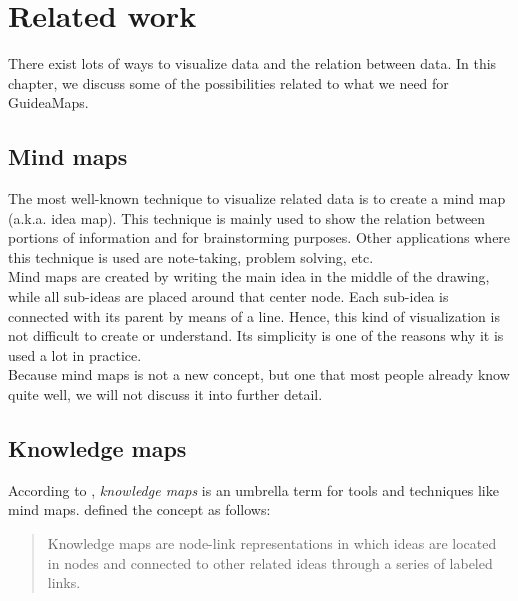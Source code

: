 \chapter{Related work}\label{ch:related-work}

There exist lots of ways to visualize data and the relation between data. In this chapter, we discuss some of the possibilities related to what we need for GuideaMaps.

\section{Mind maps}
The most well-known technique to visualize related data is to create a mind map (a.k.a. idea map). This technique is mainly used to show the relation between portions of information and for brainstorming purposes. Other applications where this technique is used are note-taking, problem solving, etc. \citep{knowledgemapsbalaid} \\

Mind maps are created by writing the main idea in the middle of the drawing, while all sub-ideas are placed around that center node. Each sub-idea is connected with its parent by means of a line. Hence, this kind of visualization is not difficult to create or understand. Its simplicity is one of the reasons why it is used a lot in practice.\\

Because mind maps is not a new concept, but one that most people already know quite well, we will not discuss it into further detail.





\section{Knowledge maps}
According to \cite{knowledgemapsbalaid}, \textit{knowledge maps} is an umbrella term for tools and techniques like mind maps. \cite{knowledgemapsodonnell} defined the concept as follows:

\begin{quote}
Knowledge maps are node-link representations in which ideas are located in nodes and connected to other related ideas through a series of labeled links. \hfill 
\end{quote}

